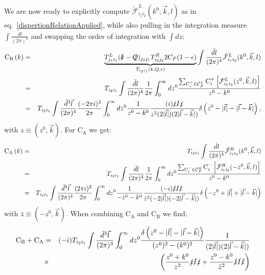\documentclass[11pt]{article}
\begin{document}
We are now ready to explicitly compute $\mathcal{\tilde{F}}^{L}_{i_1i_2}(k^0, \vec{k},l)$ as in eq.~\ref{dispertionRelationApplied}, while also pulling in the integration measure $\int \frac{\tilde{d} l}{(2\pi)^4}$ and swapping the order of integration with $\int d z$:
\begin{eqnarray}
\label{CBexplicit}
\textrm{C}_\textrm{B}\left(k \right) &=& \underbrace{T^{L}_{j_1 i_1} (\slashed{k}-\slashed{Q})_{j_2 j_1} T^{R}_{i_2 j_2} 2 C_F (1-\epsilon)  }_{T_{i_2 i_1}(k,Q,\epsilon)}  \int \frac{\tilde{d} l}{(2\pi)^4} \mathcal{\tilde{F}}^{L}_{i_1i_2}(k^0, \vec{k},l) \nonumber\\
&=&T_{i_2 i_1}  \int \frac{\tilde{d} l}{(2\pi)^4}  \frac{1}{2\pi} \int_{0}^\infty d z^0 \frac{ \sum_{\textrm{C}^+_i\in\mathcal{C}_\mathcal{F}^{L}} \textrm{C}^+_i\left[ \mathcal{F}^{L}_{i_1i_2}(z^0, \vec{k},l)\right ] }{z^0-k^0} \nonumber \\
&=&T_{i_2 i_1}  \int \frac{\tilde{d}^3 \vec{l}}{(2\pi)^4}  \frac{(-2\pi i)^2}{2\pi} \int_{0}^\infty d z^0 \frac{1}{z^0-k^0} \frac{(i)\slashed{z}\slashed{l}\slashed{z}}{z^2 (2 |\vec{l}|) (2 |\vec{l}-\vec{k}|)} \delta \left(z^0-|\vec{l}|-|\vec{l}-\vec{k}|\right), \nonumber \\
\end{eqnarray}
with $z\equiv(z^0,\vec{k})$.
For $\textrm{C}_\textrm{A}$ we get:
\begin{eqnarray}
\label{CAexplicit}
\textrm{C}_\textrm{A}\left(k \right) &=& T_{i_2 i_1} \int \frac{\tilde{d} l}{(2\pi)^4} \mathcal{\tilde{F}}^{R}_{i_1i_2}(k^0, \vec{k},l)\nonumber\\
&=&T_{i_2 i_1}  \int \frac{\tilde{d} l}{(2\pi)^4}  \frac{1}{2\pi} \int_{0}^\infty d z^0 \frac{ \sum_{\textrm{C}^-_i\in\mathcal{C}_\mathcal{F}^{R}} \textrm{C}^-_i\left[ \mathcal{F}^{R}_{i_1i_2}(-z^0, \vec{k},l)\right ] }{z^0-k^0} \nonumber \\
&=&T_{i_2 i_1}  \int \frac{\tilde{d}^3 \vec{l}}{(2\pi)^4}  \frac{(2\pi i)^2}{2\pi} \int_{0}^\infty d z^0 \frac{1}{-z^0-k^0} \frac{(-i)\slashed{\bar{z}}\slashed{l}\slashed{\bar{z}}}{\bar{z}^2 (-2 |\vec{l}|) (-2 |\vec{l}-\vec{k}|)} \delta \left(-z^0+|\vec{l}|+|\vec{l}-\vec{k}|\right) \nonumber \\
\end{eqnarray}
with $\bar{z}\equiv(-z^0,\vec{k})$.
When combining $\textrm{C}_\textrm{A}$ and $\textrm{C}_\textrm{B}$ we find:
\begin{eqnarray}
\textrm{C}_\textrm{B}+ \textrm{C}_\textrm{A} &=& (-i)T_{i_2 i_1}  \int \frac{\tilde{d}^3 \vec{l}}{(2\pi)^3} \int_{0}^\infty d z^0 \frac{\delta \left(z^0-|\vec{l}|-|\vec{l}-\vec{k}|\right)}{(z^0)^2-(k^0)^2} \frac{1}{(2 |\vec{l}|) (2 |\vec{l}-\vec{k}|)} \nonumber \\
&\times&\left( 
\frac{z^0+k^0}{z^2} \slashed{z}\slashed{l}\slashed{z} + \frac{z^0-k^0}{\bar{z}^2} \slashed{\bar{z}}\slashed{l}\slashed{\bar{z}}
\right)
\end{eqnarray}
\end{document}
